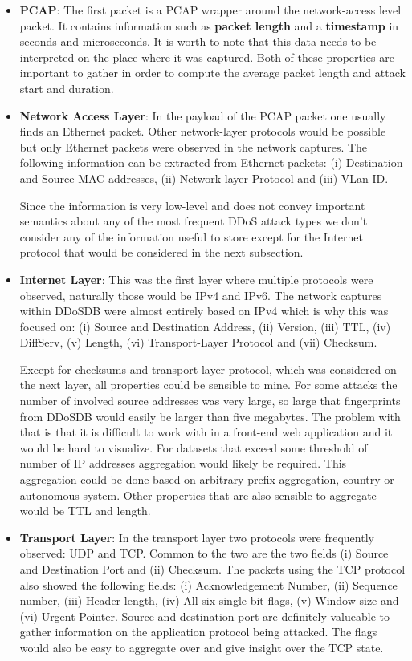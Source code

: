 \begin{itemize}
\item \textbf{PCAP}:
The first packet is a PCAP wrapper around the network-access level packet. It contains information such as \textbf{packet length} and a \textbf{timestamp} in seconds and microseconds. It is worth to note that this data needs to be interpreted on the place where it was captured.
Both of these properties are important to gather in order to compute the average packet length and attack start and duration.

\item \textbf{Network Access Layer}: 
In the payload of the PCAP packet one usually finds an Ethernet packet. Other network-layer protocols would be possible but only Ethernet packets were observed in the network captures.
The following information can be extracted from Ethernet packets:
(i) Destination and Source MAC addresses, (ii) Network-layer Protocol and (iii) VLan ID.

Since the information is very low-level and does not convey important semantics about any of the most frequent DDoS attack types we don't consider any of the information useful to store except for the Internet protocol that would be considered in the next subsection.


\item \textbf{Internet Layer}: 
This was the first layer where multiple protocols were observed, naturally those would be IPv4 and IPv6. The network captures within DDoSDB were almost entirely based on IPv4 which is why this was focused on:
(i) Source and Destination Address, (ii) Version, (iii) TTL, (iv) DiffServ, (v) Length, (vi) Transport-Layer Protocol and (vii) Checksum.

Except for checksums and transport-layer protocol, which was considered on the next layer, all properties could be sensible to mine.
For some attacks the number of involved source addresses was very large, so large that fingerprints from DDoSDB would easily be larger than five megabytes. The problem with that is that it is difficult to work with in a front-end web application and it would be hard to visualize. For datasets that exceed some threshold of number of IP addresses aggregation would likely be required. This aggregation could be done based on arbitrary prefix aggregation, country or autonomous system.
Other properties that are also sensible to aggregate would be TTL and length.

\item \textbf{Transport Layer}: 
In the transport layer two protocols were frequently observed: UDP and TCP.
Common to the two are the two fields (i) Source and Destination Port and (ii) Checksum.
The packets using the TCP protocol also showed the following fields: (i) Acknowledgement Number, (ii) Sequence number, (iii) Header length, (iv) All six single-bit flags, (v) Window size and (vi) Urgent Pointer.
Source and destination port are definitely valueable to gather information on the application protocol being attacked. The flags would also be easy to aggregate over and give insight over the TCP state.

\end{itemize}

